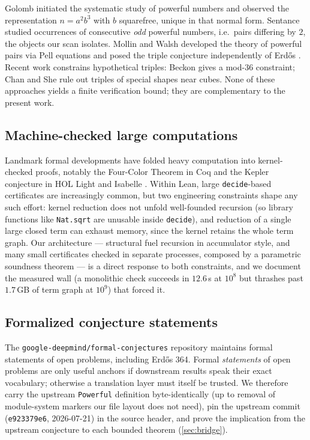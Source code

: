 \documentclass[11pt]{article}
\theoremstyle{definition}
\theoremstyle{remark}
\newcommand{\code}[1]{\texttt{#1}}
\newcommand{\Powerful}{\code{Powerful}}
\begin{document}
Golomb \cite{Golomb1970} initiated the systematic study of powerful
numbers and observed the representation $n = a^2 b^3$ with $b$
squarefree, unique in that normal form. Sentance \cite{Sentance1981}
studied occurrences of consecutive \emph{odd} powerful numbers, i.e.\
pairs differing by $2$, the objects our scan isolates. Mollin and Walsh
\cite{MollinWalsh1986} developed the theory of powerful pairs via
Pell equations and posed the triple conjecture independently of Erd\H{o}s
\cite{Erdos1976}. Recent work constrains hypothetical triples: Beckon
\cite{Beckon2019} gives a mod-$36$ constraint; Chan \cite{Chan2025} and
She \cite{She2025} rule out triples of special shapes near cubes. None of
these approaches yields a finite verification bound; they are
complementary to the present work.

\subsection{Machine-checked large computations}

Landmark formal developments have folded heavy computation into
kernel-checked proofs, notably the Four-Color Theorem in Coq
\cite{Gonthier2008} and the Kepler conjecture in HOL Light and Isabelle
\cite{Hales2017}. Within Lean, large \code{decide}-based certificates are
increasingly common, but two engineering constraints shape any such
effort: kernel reduction does not unfold well-founded recursion (so
library functions like \code{Nat.sqrt} are unusable inside
\code{decide}), and reduction of a single large closed term can exhaust
memory, since the kernel retains the whole term graph. Our architecture
--- structural fuel recursion in accumulator style, and many small
certificates checked in separate processes, composed by a parametric
soundness theorem --- is a direct response to both constraints, and we
document the measured wall (a monolithic check succeeds in $12.6$\,s at
$10^8$ but thrashes past $1.7$\,GB of term graph at $10^9$) that forced
it.

\subsection{Formalized conjecture statements}

The \code{google-deepmind/formal-conjectures} repository
\cite{FormalConjectures} maintains formal statements of open problems,
including Erd\H{o}s 364. Formal \emph{statements} of open problems are
only useful anchors if downstream results speak their exact vocabulary;
otherwise a translation layer must itself be trusted. We therefore carry
the upstream \Powerful{} definition byte-identically (up to removal of
module-system markers our file layout does not need), pin the upstream
commit (\code{e923379e6}, 2026-07-21) in the source header, and prove the
implication from the upstream conjecture to each bounded theorem
(\cref{sec:bridge}).
\end{document}
